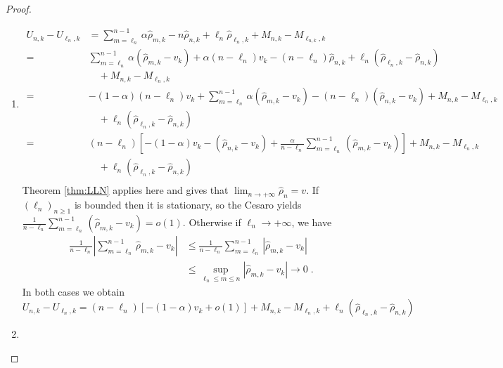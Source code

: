 \begin{proof}
	\begin{enumerate}[label=(\roman*)]
		\item \begin{align*}
			U_{n,k} - U_{\ell_{n},k} &= \sum_{m=\ell_{n}}^{n-1} \alpha \hat{\rho}_{m,k} - n \hat{\rho}_{n,k} + \ell_{n} \hat{\rho}_{\ell_{n},k} + M_{n,k} - M_{\ell_{n,k},k} \\
			=& \sum_{m=\ell_{n}}^{n-1} \alpha (\hat{\rho}_{m,k} - v_k) + \alpha(n - \ell_{n}) v_k - (n - \ell_{n}) \hat{\rho}_{n,k} + \ell_{n} (\hat{\rho}_{\ell_{n},k} - \hat{\rho}_{n,k}) \\ 
			&\quad + M_{n,k} - M_{\ell_{n},k} \\
			=& -(1 - \alpha)(n - \ell_{n}) v_k + \sum_{m=\ell_{n}}^{n-1} \alpha (\hat{\rho}_{m,k} - v_k) - (n - \ell_{n})(\hat{\rho}_{n,k} - v_k) + M_{n,k} - M_{\ell_{n},k} \\
			&\quad + \ell_{n} (\hat{\rho}_{\ell_{n},k} - \hat{\rho}_{n,k}) \\ 
			=& (n-\ell_{n})\left[-(1 - \alpha)v_k - (\hat{\rho}_{n,k} - v_k) + \frac{\alpha}{n - \ell_{n}}\sum_{m=\ell_{n}}^{n-1} (\hat{\rho}_{m,k} - v_k)\right]+ M_{n,k} - M_{\ell_{n},k} \\
			&\quad + \ell_{n} (\hat{\rho}_{\ell_{n},k} - \hat{\rho}_{n,k}) \\
		\end{align*}
		Theorem \ref{thm:LLN} applies here and gives that \(\lim_{n \to +\infty} \hat{\rho}_n = v\). If \(\left(\ell_{n}\right)_{n \geq 1}\) is bounded then it is stationary, so the Cesaro yields \(\frac{1}{n - \ell_{n}}\sum_{m=\ell_{n}}^{n-1} (\hat{\rho}_{m,k} - v_k) = o(1)\). Otherwise if \(\ell_{n} \to +\infty\), we have
		\begin{align*}
			\frac{1}{n - \ell_{n}}\left|\sum_{m=\ell_{n}}^{n-1} \hat{\rho}_{m,k} - v_k\right| &\leq \frac{1}{n - \ell_{n}}\sum_{m=\ell_{n}}^{n-1} |\hat{\rho}_{m,k} - v_k| \\
			&\leq \sup_{\ell_{n} \leq m \leq n}|\hat{\rho}_{m,k} - v_k| \to 0\;.
		\end{align*}		
		In both cases we obtain
		\begin{equation*}
			U_{n,k} - U_{\ell_{n},k} = (n - \ell_{n})[-(1 - \alpha)v_k + o(1)] + M_{n,k} - M_{\ell_{n},k} + \ell_{n} (\hat{\rho}_{\ell_{n},k} - \hat{\rho}_{n,k})
		\end{equation*}
		\item 
		

\end{enumerate}
\end{proof}
